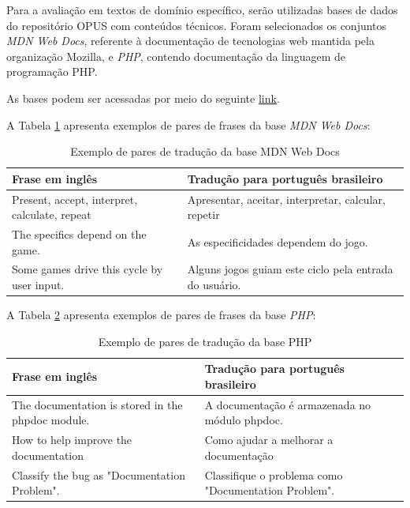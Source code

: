 Para a avaliação em textos de domínio específico, serão utilizadas bases de dados do repositório OPUS com conteúdos técnicos. Foram selecionados os conjuntos \textit{MDN Web Docs}, referente à documentação de tecnologias web mantida pela organização Mozilla, e \textit{PHP}, contendo documentação da linguagem de programação PHP.

As bases podem ser acessadas por meio do seguinte \href{https://opus.nlpl.eu/corpora-search/en&pt-BR}{link}.

A Tabela \ref{tab:MDNwebdocs} apresenta exemplos de pares de frases da base \textit{MDN Web Docs}:

\begin{table}[H]
\centering
\begin{tabular}{  |>{\centering\arraybackslash}p{6cm}|>{\centering\arraybackslash}p{6cm}| }
\hline
\textbf{Frase em inglês} & \textbf{Tradução para português brasileiro} \\
\hline
Present, accept, interpret, calculate, repeat & Apresentar, aceitar, interpretar, calcular, repetir \\
\hline
The specifics depend on the game. & As especificidades dependem do jogo. \\
\hline
Some games drive this cycle by user input. & Alguns jogos guiam este ciclo pela entrada do usuário. \\
\hline
\end{tabular}
\caption{Exemplo de pares de tradução da base MDN Web Docs}
\label{tab:MDNwebdocs}
\end{table}

A Tabela \ref{tab:PHP} apresenta exemplos de pares de frases da base \textit{PHP}:

\begin{table}[H]
\centering
\begin{tabular}{  |>{\centering\arraybackslash}p{6cm}|>{\centering\arraybackslash}p{6cm}| }
\hline
\textbf{Frase em inglês} & \textbf{Tradução para português brasileiro} \\
\hline
The documentation is stored in the phpdoc module. & A documentação é armazenada no módulo phpdoc. \\
\hline
How to help improve the documentation & Como ajudar a melhorar a documentação \\
\hline
Classify the bug as "Documentation Problem". & Classifique o problema como "Documentation Problem". \\
\hline
\end{tabular}
\caption{Exemplo de pares de tradução da base PHP}
\label{tab:PHP}
\end{table}


